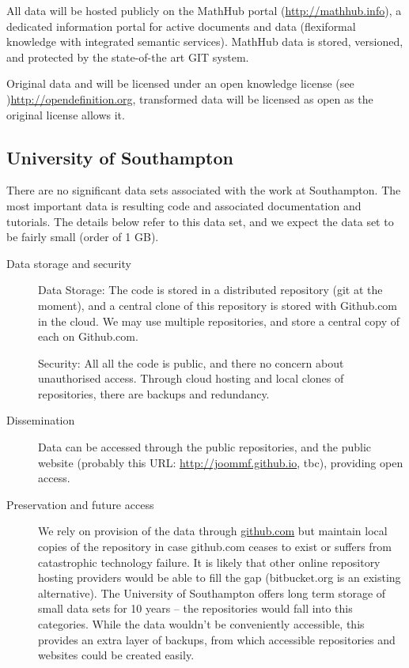 \documentclass[12pt]{article}
\begin{document}
All data will be hosted publicly on the MathHub portal (\url{http://mathhub.info}), a
dedicated information portal for active documents and data (flexiformal knowledge with
integrated semantic services). MathHub data is stored, versioned, and protected by the
state-of-the art GIT system.

Original data and will be licensed under an open knowledge license (see
)\url{http://opendefinition.org}, transformed data will be licensed as open as the
original license allows it.

\subsection{University of Southampton}

There are no significant data sets associated with the work at Southampton. The most important data is resulting code and associated documentation and tutorials. The details below refer to this data set, and we expect the data set to be fairly small (order of 1 GB).
\begin{description}
\item[Data storage and security] Data Storage: The code is stored in a distributed repository (git at the moment), and a central clone of this repository is stored with Github.com in the cloud. We may use multiple repositories, and store a central copy of each on Github.com.

  Security: All all the code is public, and there no concern about unauthorised access. Through cloud hosting and local clones of repositories, there are backups and redundancy.
\item[Dissemination] Data can be accessed through the public repositories, and the public website (probably this URL: \href{http://joommf.github.io}{http://joommf.github.io}, tbc), providing open access.
\item[Preservation and future access] We rely on provision of the data through \href{github.com}{github.com} but maintain local copies of the repository in case github.com ceases to exist or suffers from catastrophic technology failure. It is likely that other online repository hosting providers would be able to fill the gap (bitbucket.org is an existing alternative). The University of Southampton offers long term storage of small data sets for 10 years -- the repositories would fall into this categories. While the data wouldn't be conveniently accessible, this provides an extra layer of backups, from which accessible repositories and websites could be created easily.
\end{description}
\end{document}
